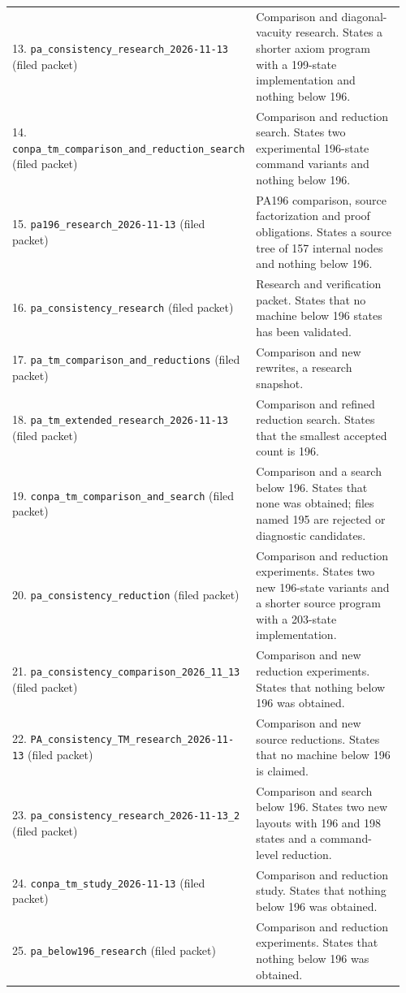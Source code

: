 \begin{longtable}{@{}p{0.35\linewidth}p{0.61\linewidth}@{}}
13. \nolinkurl{pa_consistency_research_2026-11-13} (filed packet) & Comparison and diagonal-vacuity research. States a shorter axiom program with a 199-state implementation and nothing below 196.\\[5pt]
14. \nolinkurl{conpa_tm_comparison_and_reduction_search} (filed packet) & Comparison and reduction search. States two experimental 196-state command variants and nothing below 196.\\[5pt]
15. \nolinkurl{pa196_research_2026-11-13} (filed packet) & PA196 comparison, source factorization and proof obligations. States a source tree of 157 internal nodes and nothing below 196.\\[5pt]
16. \nolinkurl{pa_consistency_research} (filed packet) & Research and verification packet. States that no machine below 196 states has been validated.\\[5pt]
17. \nolinkurl{pa_tm_comparison_and_reductions} (filed packet) & Comparison and new rewrites, a research snapshot.\\[5pt]
18. \nolinkurl{pa_tm_extended_research_2026-11-13} (filed packet) & Comparison and refined reduction search. States that the smallest accepted count is 196.\\[5pt]
19. \nolinkurl{conpa_tm_comparison_and_search} (filed packet) & Comparison and a search below 196. States that none was obtained; files named 195 are rejected or diagnostic candidates.\\[5pt]
20. \nolinkurl{pa_consistency_reduction} (filed packet) & Comparison and reduction experiments. States two new 196-state variants and a shorter source program with a 203-state implementation.\\[5pt]
21. \nolinkurl{pa_consistency_comparison_2026_11_13} (filed packet) & Comparison and new reduction experiments. States that nothing below 196 was obtained.\\[5pt]
22. \nolinkurl{PA_consistency_TM_research_2026-11-13} (filed packet) & Comparison and new source reductions. States that no machine below 196 is claimed.\\[5pt]
23. \nolinkurl{pa_consistency_research_2026-11-13_2} (filed packet) & Comparison and search below 196. States two new layouts with 196 and 198 states and a command-level reduction.\\[5pt]
24. \nolinkurl{conpa_tm_study_2026-11-13} (filed packet) & Comparison and reduction study. States that nothing below 196 was obtained.\\[5pt]
25. \nolinkurl{pa_below196_research} (filed packet) & Comparison and reduction experiments. States that nothing below 196 was obtained.\\[5pt]

\end{longtable}
